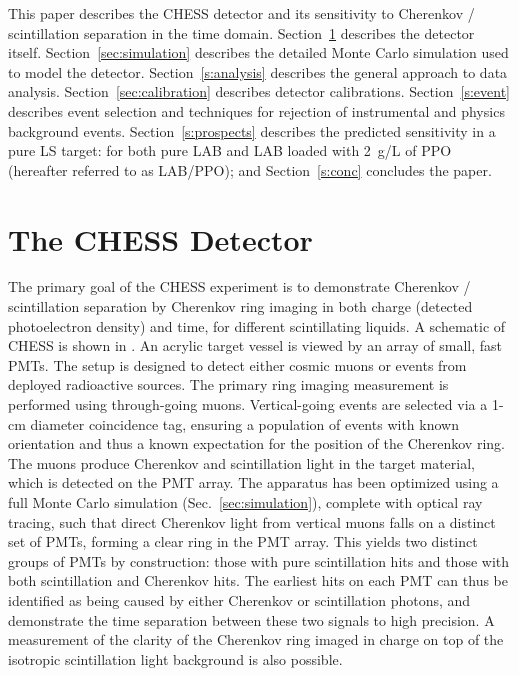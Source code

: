 This paper describes the CHESS detector and its sensitivity to Cherenkov / scintillation separation in  the time domain.  Section~\ref{s:desc} describes the detector itself.  Section~\ref{sec:simulation} describes the detailed Monte Carlo simulation used to model the detector. 
Section~\ref{s:analysis} describes the general approach to data analysis.  Section~\ref{sec:calibration} describes detector calibrations.  Section~\ref{s:event} describes event selection and techniques for rejection of instrumental and physics background events.  Section~\ref{s:prospects} describes the predicted sensitivity in a pure LS target: for both pure LAB and LAB loaded with 2~g/L of PPO (hereafter referred to as LAB/PPO); and Section~\ref{s:conc} concludes the paper.


\section{The CHESS Detector}\label{s:desc}

The primary goal of the CHESS experiment is to demonstrate Cherenkov / scintillation  separation by Cherenkov ring imaging in both charge (detected photoelectron density) and time, for different scintillating liquids.  
A schematic of CHESS is shown in .  An acrylic target vessel is viewed by an array of small, fast PMTs. 
The setup is designed to detect either cosmic muons or events from deployed radioactive sources.  The primary ring imaging measurement is performed using through-going muons.  Vertical-going events are selected via a 1-cm diameter coincidence tag, ensuring a population of events with known orientation and thus a known expectation for the position of the Cherenkov ring. 
The muons produce Cherenkov and scintillation light in the target material, which is detected on the PMT array. The apparatus has been optimized using a full Monte Carlo simulation (Sec.~\ref{sec:simulation}), complete with optical ray tracing, such that direct Cherenkov light from vertical muons falls on a distinct set of PMTs, forming a clear ring in the PMT array.  This yields two distinct groups of PMTs by construction: those with pure scintillation hits and those with both scintillation and Cherenkov hits. The earliest hits on each PMT can thus be identified as being caused by either Cherenkov or scintillation photons, and demonstrate the time separation between these two signals to high precision. 
A  measurement of the clarity of the Cherenkov ring imaged in charge on top of the isotropic scintillation light background is also possible.

